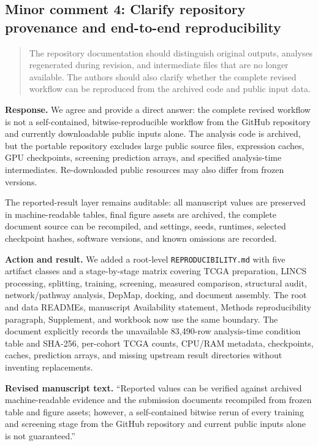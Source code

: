 \documentclass[10pt]{article}
\newenvironment{reviewcomment}{%
  \begin{quote}\small\itshape\color{black}
}{\end{quote}}
\newcommand{\Response}{\textbf{Response.} }
\newcommand{\Action}{\textbf{Action and result.} }
\newcommand{\RevisedText}{\textbf{Revised manuscript text.} }
\newcommand{\qtext}[1]{``#1''}
\begin{document}
\subsection*{Minor comment 4: Clarify repository provenance and end-to-end reproducibility}

\begin{reviewcomment}
The repository documentation should distinguish original outputs, analyses regenerated during revision, and intermediate files that are no longer available. The authors should also clarify whether the complete revised workflow can be reproduced from the archived code and public input data.
\end{reviewcomment}

\Response We agree and provide a direct answer: the complete revised workflow is not a self-contained, bitwise-reproducible workflow from the GitHub repository and currently downloadable public inputs alone. The analysis code is archived, but the portable repository excludes large public source files, expression caches, GPU checkpoints, screening prediction arrays, and specified analysis-time intermediates. Re-downloaded public resources may also differ from frozen versions.

The reported-result layer remains auditable: all manuscript values are preserved in machine-readable tables, final figure assets are archived, the complete document source can be recompiled, and settings, seeds, runtimes, selected checkpoint hashes, software versions, and known omissions are recorded.

\Action We added a root-level \texttt{REPRODUCIBILITY.md} with five artifact classes and a stage-by-stage matrix covering TCGA preparation, LINCS processing, splitting, training, screening, measured comparison, structural audit, network/pathway analysis, DepMap, docking, and document assembly. The root and data READMEs, manuscript Availability statement, Methods reproducibility paragraph, Supplement, and workbook now use the same boundary. The document explicitly records the unavailable 83,490-row analysis-time condition table and SHA-256, per-cohort TCGA counts, CPU/RAM metadata, checkpoints, caches, prediction arrays, and missing upstream result directories without inventing replacements.

\RevisedText \qtext{Reported values can be verified against archived machine-readable evidence and the submission documents recompiled from frozen table and figure assets; however, a self-contained bitwise rerun of every training and screening stage from the GitHub repository and current public inputs alone is not guaranteed.}
\end{document}
